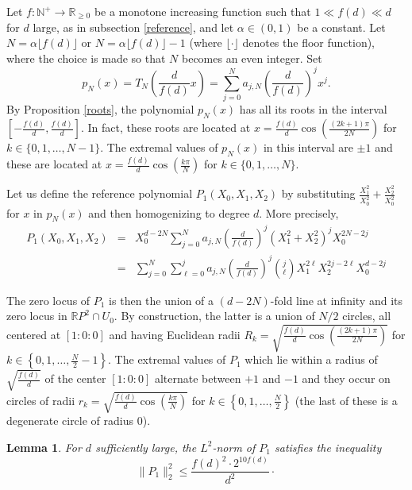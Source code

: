 \documentclass [11pt]{amsart}
\newtheorem {lemma}[theorem]{Lemma}
\theoremstyle{remark}
\numberwithin{equation}{section}
\numberwithin{theorem}{section}
\begin{document}
Let $f:\mathbb{N^{+}}\rightarrow \mathbb{R}_{\geq 0}$ be a monotone increasing function such that $1 \ll f(d)\ll d$ for $d$ large, as in subsection \ref{reference}, and let $\alpha\in (0,1)$ be a constant. Let $N=\alpha \lfloor f(d) \rfloor$ or $N=\alpha \lfloor f(d) \rfloor-1$ (where $\lfloor \cdot \rfloor$ denotes the floor function), where the choice is made so that $N$ becomes an even integer. Set 
\[ p_{N}(x)=T_{N}\left(\frac{d}{f(d)} x\right) = \sum_{j=0}^{N} a_{j,N} \left( \frac{d}{f(d)}\right)^{j} x^{j}. \]
By Proposition \ref{roots}, the polynomial $p_{N}(x)$ has all its roots in the interval $\displaystyle{ \left[ -\frac{f(d)}{d}, \frac{f(d)}{d} \right]}$.  In fact, these roots are located at $\displaystyle{ x=\frac{f(d)}{d} \cos\left(\frac{(2k+1)\pi}{2N}\right)}$ for $ k\in \{0,1,\ldots,N-1\}$. The extremal values of $p_{N}(x)$ in this interval are $\pm 1$ and these are located at $\displaystyle{ x=\frac{f(d)}{d} \cos\left(\frac{k\pi}{N}\right)}$ for  $ k\in \{0,1,\ldots, N\}$. 

Let us define the reference polynomial $P_{1}(X_{0},X_{1},X_{2})$ by substituting $\displaystyle{\frac{X_{1}^2}{X_{0}^2}+\frac{X_{2}^2}{X_{0}^2}}$ for $x$ in $p_{N}(x)$ and then homogenizing to degree $d$. More precisely, 
\begin{eqnarray} 
P_{1}(X_{0},X_{1}, X_{2})&=& X_{0}^{d-2N} \sum_{j=0}^{N} a_{j,N} \left( \frac{d}{f(d)} \right)^j (X_{1}^2+X_{2}^2)^{j} X_{0}^{2N-2j}    \\
&=& \sum_{j=0}^{N} \sum_{\ell=0}^{j} a_{j,N} \left( \frac{d}{f(d)} \right)^j   {j \choose \ell}  X_{1}^{2\ell} X_{2}^{2j-2\ell} X_{0}^{d-2j}  \label{P1}
\end{eqnarray} 

\noindent The zero locus of $P_{1}$ is then the union of a $(d-2N)$-fold line at infinity and its zero locus in $\mathbb{R}P^2\cap U_{0}$. By construction, the latter is a union of $N/2$ circles, all centered at $[1:0:0]$ and having Euclidean radii $\displaystyle{R_{k}=\sqrt{ \frac{f(d)}{d} \cos\left(\frac{(2k+1)\pi}{2N}\right)}}$ for $ \displaystyle{k\in \left\{0,1,\ldots,\frac{N}{2}-1\right\} } $. The extremal values of $P_{1}$ which lie within a radius of $\displaystyle{\sqrt{\frac{f(d)}{d}}}$ of the center $[1:0:0]$ alternate between $+1$ and $-1$ and they occur on circles of radii  $\displaystyle{r_{k}= \sqrt{\frac{f(d)}{d} \cos\left(\frac{k\pi}{N}\right)}}$ for  $\displaystyle{ k\in \left\{0,1,\ldots, \frac{N}{2}\right\}}$ (the last of these is a degenerate circle of radius $0$). 

\begin{lemma} \label{P1L2}
For $d$ sufficiently large, the $L^2$-norm of $P_{1}$ satisfies the inequality 
\[  \|P_{1}\|_{2}^2 \leq   \frac{f(d)^2\cdot  2^{10f(d)}}{d^2}  \cdot   \] 
\end{lemma} 
\end{document}
